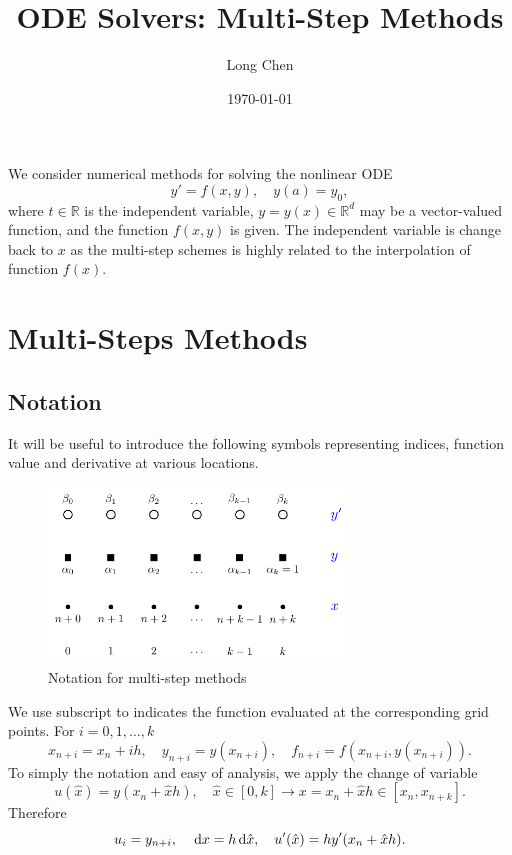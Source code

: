 \documentclass[10pt]{amsart}
\begin{document}
\title{ODE Solvers: Multi-Step Methods}
\author{Long Chen}\date{\today}
\begin{abstract}

\end{abstract}
\maketitle

\tableofcontents

We consider numerical methods for solving the nonlinear ODE  
\begin{equation}\label{ODE}  
y' = f(x, y),\quad y(a) = y_0,  
\end{equation}  
where $t \in \mathbb{R}$ is the independent variable, $y = y(x) \in \mathbb{R}^d$ may be a vector-valued function, and the function $f(x, y)$ is given. The independent variable is change back to $x$ as the multi-step schemes is highly related to the interpolation of function $f(x)$. 

\section{Multi-Steps Methods}

\subsection{Notation}
It will be useful to introduce the following symbols representing indices, function value and derivative at various locations.

\begin{figure}[htbp]
\begin{center}
\includegraphics[width=8cm]{figures/multistep.pdf}
\caption{Notation for multi-step methods}
\label{fig:multistep}
\end{center}
\end{figure}

We use subscript to indicates the function evaluated at the corresponding grid points. For $i=0,1,\ldots, k$
$$
x_{n+i} = x_n + ih, \quad y_{n+i} = y(x_{n+i}), \quad f_{n+i} = f(x_{n+i}, y(x_{n+i})).
$$
To simply the notation and easy of analysis, we apply the change of variable  
$$
u(\hat x) = y(x_{n} + \hat xh), \quad \hat x\in [0,k] \to x = x_n+ \hat x h \in [x_n, x_{n+k}].
$$
Therefore 
\begin{equation}\label{eq:change}
u_i = y_{n+i}, \quad \,{\rm d}x = h \,{\rm d} \hat{x}, \quad u'(\hat x) = h y'(x_{n} + \hat xh).
\end{equation}
\end{document}
